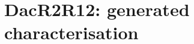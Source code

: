 \documentclass[11pt]{article}
\begin{document}
\section*{DacR2R12: generated characterisation}

\end{document}
